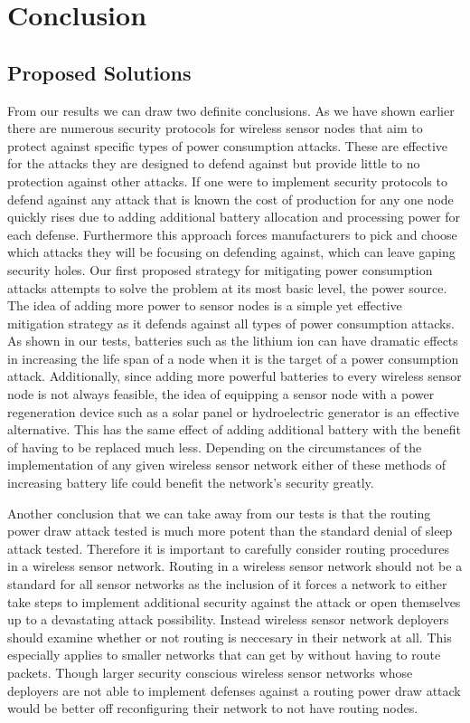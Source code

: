 \section{Conclusion}

\subsection{Proposed Solutions}
From our results we can draw two definite conclusions. As we have shown earlier there are numerous security protocols for wireless sensor nodes that aim to protect against specific types of power consumption attacks. These are effective for the attacks they are designed to defend against but provide little to no protection against other attacks. If one were to implement security protocols to defend against any attack that is known the cost of production for any one node quickly rises due to adding additional battery allocation and processing power for each defense. Furthermore this approach forces manufacturers to pick and choose which attacks they will be focusing on defending against, which can leave gaping security holes.  Our first proposed strategy for mitigating power consumption attacks attempts to solve the problem at its most basic level, the power source. The idea of adding more power to sensor nodes is a simple yet effective mitigation strategy as it defends against all types of power consumption attacks.  As shown in our tests, batteries such as the lithium ion can have dramatic effects in increasing the life span of a node when it is the target of a power consumption attack. Additionally, since adding more powerful batteries to every wireless sensor node is not always feasible, the idea of equipping a sensor node with a power regeneration device such as a solar panel or hydroelectric generator is an effective alternative. This has the same effect of adding additional battery with the benefit of having to be replaced much less. Depending on the circumstances of the implementation of any given wireless sensor network either of these methods of increasing battery life could benefit the network's security greatly.

Another conclusion that we can take away from our tests is that the routing power draw attack tested is much more potent than the standard denial of sleep attack tested. Therefore it is important to carefully consider routing procedures in a wireless sensor network. Routing in a wireless sensor network should not be a standard for all sensor networks as the inclusion of it forces a network to either take steps to implement additional security against the attack or open themselves up to a devastating attack possibility. Instead wireless sensor network deployers should examine whether or not routing is neccesary in their network at all. This especially applies to smaller networks that can get by without having to route packets.  Though larger security conscious wireless sensor networks whose deployers are not able to implement defenses against a routing power draw attack would be better off reconfiguring their network to not have routing nodes.  

